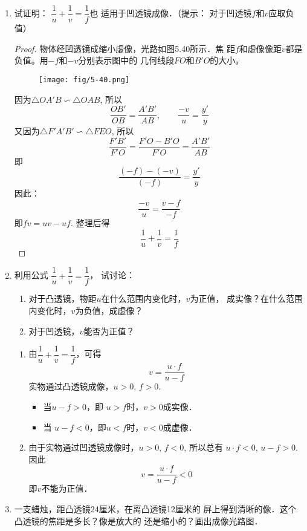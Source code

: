 \begin{enumerate}
    \item 试证明：
$\dfrac{1}{u}+\dfrac{1}{v}=\dfrac{1}{f}$也
适用于凹透镜成像．（提示：
对于凹透镜$f$和$v$应取负值）

\begin{proof}
    物体经凹透镜成缩小虚像，光路如图5.40所示．焦
距$f$和虚像像距$v$都是负值。用$-f$和$-v$分别表示图中的
几何线段$FO$和$B'O$的大小。
    \begin{figure}[htp]
        \centering
        \texttt{[image: fig/5-40.png]}
        \caption{}
    \end{figure}
    
因为$\triangle OA'B\backsim \triangle OAB$, 所以
\[\frac{OB'}{OB}=\frac{A'B'}{AB},\qquad \frac{-v}{u}=\frac{y'}{y}\]
又因为$\triangle F'A'B'\backsim \triangle FEO$, 所以
\[\frac{F'B'}{F'O}=\frac{F'O-B'O}{F'O}=\frac{A'B'}{AB}\]
即\[\frac{(-f)-(-v)}{(-f)}=\frac{y'}{y}\]
因此：
\[\frac{-v}{u}=\frac{v-f}{-f}\]
即$fv=uv-uf$. 整理后得
\[\frac{1}{u}+\frac{1}{v}=\frac{1}{f}\]
\end{proof}
\item  利用公式
$\dfrac{1}{u}+\dfrac{1}{v}=\dfrac{1}{f}$，
试讨论：
\begin{enumerate}
    \item 对于凸透镜，物距$u$在什么范围内变化时，$v$为正值，
    成实像？在什么范围内变化时，$v$为负值，成虚像？
    \item 对于凹透镜，$v$能否为正值？
\end{enumerate}

\begin{solution}
    \begin{enumerate}
        \item 由$\dfrac{1}{u}+\dfrac{1}{v}=\dfrac{1}{f}$，可得
    \[v=\frac{u\cdot f}{u-f}\]
    实物通过凸透镜成像，$u>0$, $f>0$.
    \begin{itemize}
        \item     当$u-f>0$，即 $u>f$时，$v>0$成实像．
        \item  当 $u-f<0$，即$u<f$时，$v<0$成虚像．
    \end{itemize}
\item 由于实物通过凹透镜成像时，$u>0$, $f<0$, 所以总有
    $u\cdot f<0$, $u-f>0$. 因此
    \[v=\frac{u\cdot f}{u-f}<0\]
    即$v$不能为正值．
    \end{enumerate}
\end{solution}
\item 一支蜡烛，距凸透镜24厘米，在离凸透镜12厘米的
屏上得到清晰的像．这个凸透镜的焦距是多长？像是放大的
还是缩小的？画出成像光路图．


\end{enumerate}

